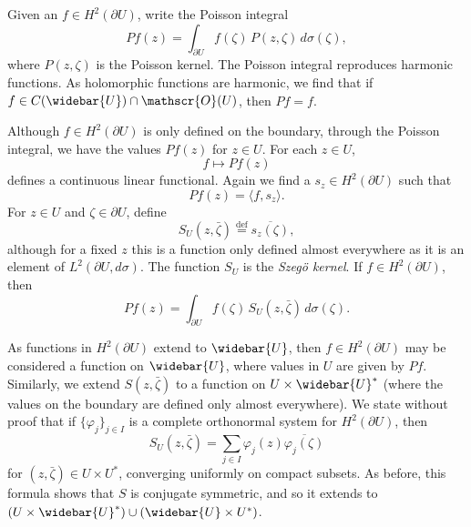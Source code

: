 \documentclass[12pt,openany]{book}
\newcommand{\linnprod}[2]{\langle #1 , #2 \rangle}
\newcommand{\sO}{{\mathscr{O}}}
\newcommand{\myindex}[1]{#1\index{#1}}
\theoremstyle{plain}
\theoremstyle{remark}
\theoremstyle{definition}
\theoremstyle{exercise}
\theoremstyle{example}
\begin{document}
Given an $f \in H^2(\partial U)$, write the Poisson integral
\begin{equation*}
Pf(z) = \int_{\partial U} f(\zeta) \, P(z,\zeta) \, d \sigma(\zeta) ,
\end{equation*}
where $P(z,\zeta)$ is the Poisson kernel.  The Poisson integral
reproduces harmonic functions.  As holomorphic functions are harmonic, we
find that if $f \in C(\widebar{U}) \cap \sO(U)$, then $Pf = f$.

Although $f \in H^2(\partial U)$ is only defined on the boundary,
through the Poisson integral, we have the values
$Pf(z)$ for $z \in U$.
For each $z \in U$,
\begin{equation*}
f \mapsto Pf(z)
\end{equation*}
defines a continuous linear functional.  Again we find a $s_z \in
H^2(\partial U)$ such that
\begin{equation*}
Pf(z) = \linnprod{f}{s_z} .
\end{equation*}
For $z \in U$ and $\zeta \in \partial U$, define
%
\begin{equation*}
S_U(z,\bar{\zeta}) \overset{\text{def}}{=} \overline{s_z(\zeta)} ,
\end{equation*}
although for a fixed $z$ this is a function only defined almost everywhere
as it is an element of $L^2(\partial U,d\sigma)$.
The function $S_U$ is the \emph{\myindex{Szeg{\"o} kernel}}.
If $f \in H^2(\partial U)$, then
\begin{equation*}
Pf(z) = \int_{\partial U} f(\zeta) \, S_U(z,\bar{\zeta}) \, d\sigma(\zeta) .
\end{equation*}

As functions in $H^2(\partial U)$ extend to $\widebar{U}$, then 
$f \in H^2(\partial U)$ may be considered a function on
$\widebar{U}$, where values in $U$ are given by $Pf$.  Similarly, we 
extend $S(z,\bar{\zeta})$ to a function on $U \times \widebar{U}^*$ (where
the values on the boundary are defined only almost everywhere).
We state without proof that if $\{ \varphi_j \}_{j\in I}$ is a complete
orthonormal system for $H^2(\partial U)$, then 
\begin{equation} \label{eq:formulaszego}
S_U(z,\bar{\zeta}) = \sum_{j \in I} \varphi_j(z)\overline{\varphi_j(\zeta)}
\end{equation}
for $(z,\bar{\zeta}) \in U \times U^*$, converging uniformly on compact subsets.
As before, this formula shows that $S$ is conjugate symmetric,
and so it extends to 
$(U \times \widebar{U}^*) \cup (\widebar{U} \times U^*)$.
\end{document}
